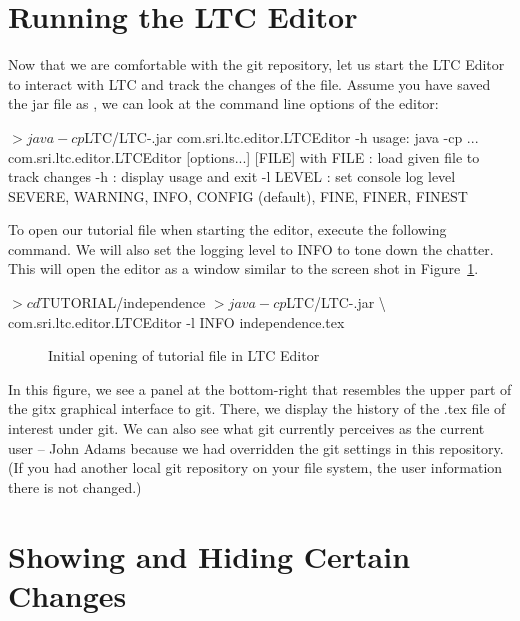 \section{Running the LTC Editor}

Now that we are comfortable with the git repository, let us start the LTC Editor to interact with LTC and track the changes of the file.  Assume you have saved the jar file as , we can look at the command line options of the editor:
\begin{CodeVerbatim}[commandchars=\\\{\}]
$> java -cp $LTC/LTC-\version.jar com.sri.ltc.editor.LTCEditor -h
usage: java -cp ... com.sri.ltc.editor.LTCEditor [options...] [FILE] 
with
 FILE     : load given file to track changes
 -h       : display usage and exit
 -l LEVEL : set console log level
            SEVERE, WARNING, INFO, CONFIG (default), FINE, FINER, FINEST
\end{CodeVerbatim}

To open our tutorial file when starting the editor, execute the following command.  We will also set the logging level to INFO to tone down the chatter.  This will open the editor as a window similar to the screen shot in Figure~\ref{fig:editor-open}.
\begin{CodeVerbatim}[samepage=true,commandchars=\\\{\}]
$> cd $TUTORIAL/independence
$> java -cp $LTC/LTC-\version.jar \textbackslash
   com.sri.ltc.editor.LTCEditor -l INFO independence.tex
\end{CodeVerbatim}
\begin{figure}[t]
\centering
{}
\caption{Initial opening of tutorial file in LTC Editor} \label{fig:editor-open}
\end{figure}
In this figure, we see a panel at the bottom-right that resembles the upper part of the gitx graphical interface to git.  There, we display the history of the .tex file of interest under git.  We can also see what git currently perceives as the current user -- John Adams because we had overridden the git settings in this repository.  (If you had another local git repository on your file system, the user information there is not changed.)

\section{Showing and Hiding Certain Changes}

